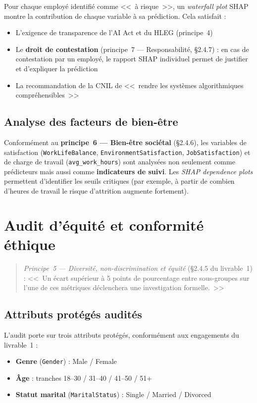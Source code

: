 \documentclass[12pt,a4paper]{article}
\begin{document}
Pour chaque employé identifié comme <<~à risque~>>, un \textit{waterfall plot} SHAP montre la contribution de chaque variable à sa prédiction. Cela satisfait :
\begin{itemize}
    \item L'exigence de transparence de l'AI Act et du HLEG (principe~4)
    \item Le \textbf{droit de contestation} (principe~7 --- Responsabilité, §2.4.7) : en cas de contestation par un employé, le rapport SHAP individuel permet de justifier et d'expliquer la prédiction
    \item La recommandation de la CNIL de <<~rendre les systèmes algorithmiques compréhensibles~>>
\end{itemize}

\subsection{Analyse des facteurs de bien-être}

Conformément au \textbf{principe~6 --- Bien-être sociétal} (§2.4.6), les variables de satisfaction (\texttt{WorkLifeBalance}, \texttt{EnvironmentSatisfaction}, \texttt{JobSatisfaction}) et de charge de travail (\texttt{avg\_work\_hours}) sont analysées non seulement comme prédicteurs mais aussi comme \textbf{indicateurs de suivi}. Les \textit{SHAP dependence plots} permettent d'identifier les seuils critiques (par exemple, à partir de combien d'heures de travail le risque d'attrition augmente fortement).

\section{Audit d'équité et conformité éthique}

\begin{quote}
\textit{Principe~5 --- Diversité, non-discrimination et équité} (§2.4.5 du livrable~1) : <<~Un écart supérieur à 5 points de pourcentage entre sous-groupes sur l'une de ces métriques déclenchera une investigation formelle.~>>
\end{quote}

\subsection{Attributs protégés audités}

L'audit porte sur trois attributs protégés, conformément aux engagements du livrable~1 :
\begin{itemize}
    \item \textbf{Genre} (\texttt{Gender}) : Male / Female
    \item \textbf{Âge} : tranches 18--30 / 31--40 / 41--50 / 51+
    \item \textbf{Statut marital} (\texttt{MaritalStatus}) : Single / Married / Divorced
\end{itemize}
\end{document}
